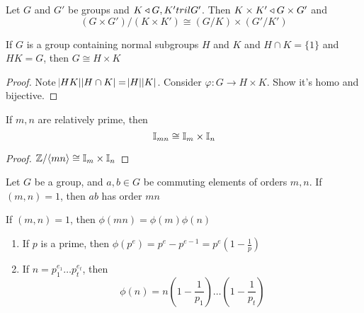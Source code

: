 \documentclass[11pt]{article}
\begin{document}
\begin{proposition}[]
Let \(G\) and \(G'\) be groups and \(K\triangleleft G, K'tril G'\). Then \(K\times K'\triangleleft
   G\times G'\) and
\begin{equation*}
(G\times G')/(K\times K')\cong (G/K)\times(G'/K')
\end{equation*}
\end{proposition}

\begin{proposition}[]
If \(G\) is a group containing normal subgroups \(H\) and \(K\) and \(H\cap K=\{1\}\)
and \(HK=G\), then \(G\cong H\times K\)
\end{proposition}

\begin{proof}
Note \(\abs{HK}\abs{H\cap K}=\abs{H}\abs{K}\). Consider \(\varphi:G\to H\times
   K\). Show it's homo and bijective.
\end{proof}

\begin{theorem}[]
If \(m,n\) are relatively prime, then
\begin{equation*}
\mathbb{I}_{mn}\cong\mathbb{I}_m\times\mathbb{I}_n
\end{equation*}
\end{theorem}

\begin{proof}
\(\mathbb{Z}/\langle mn\rangle\cong\mathbb{I}_m\times\mathbb{I}_n\)
\end{proof}

\begin{proposition}[]
Let \(G\) be a group, and \(a,b\in G\) be commuting elements of orders \(m,n\). If
\((m,n)=1\), then \(ab\) has order \(mn\)
\end{proposition}

\begin{corollary}[]
If \((m,n)=1\), then \(\phi(mn)=\phi(m)\phi(n)\)
\end{corollary}


\begin{corollary}[]
\begin{enumerate}
\item If \(p\) is a prime, then \(\phi(p^e)=p^e-p^{e-1}=p^e(1-\frac{1}{p})\)
\item If \(n=p_1^{e_1}\dots p_t^{e_t}\), then
\begin{equation*}
\phi(n)=n(1-\frac{1}{p_1})\dots(1-\frac{1}{p_t})
\end{equation*}
\end{enumerate}
\end{corollary}
\end{document}
